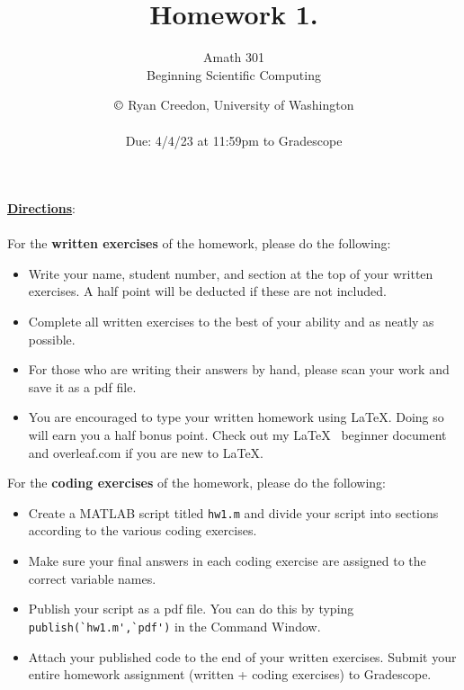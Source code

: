 \documentclass[12pt]{article}
\begin{document}
 
 
 
\title{\textbf{Homework 1.}}%
\author{Amath 301 \\ Beginning Scientific Computing} %
\date{\normalsize $\copyright$ Ryan Creedon, University of Washington \\~\\ \large Due: 4/4/23 at 11:59pm to Gradescope}
\maketitle
\noindent \underline{\textbf{Directions}}: \\\\  For the \textbf{written exercises} of the homework, please do the following:
\begin{itemize}
    \item Write your name, student number, and section at the top of your written exercises. A half point will be deducted if these are not included.
    \item Complete all written exercises to the best of your ability and as neatly as possible.
    \item For those who are writing their answers by hand, please scan your work and save it as a pdf file. 
    \item You are encouraged to type your written homework using \LaTeX. Doing so will earn you a half bonus point. Check out my \LaTeX~ beginner document and overleaf.com if you are new to \LaTeX. 
\end{itemize}
For the \textbf{coding exercises} of the homework, please do the following:
\begin{itemize}
    \item Create a MATLAB script titled \verb|hw1.m| and divide your script into sections according to the various coding exercises.
    \item Make sure your final answers in each coding exercise are assigned to the correct variable names. 
    \item Publish your script as a pdf file. You can do this by typing \verb|publish(`hw1.m',`pdf')| in the Command Window. 
    \item Attach your published code to the end of your written exercises. Submit your entire homework assignment (written + coding exercises) to Gradescope.  
\end{itemize}
\end{document}
